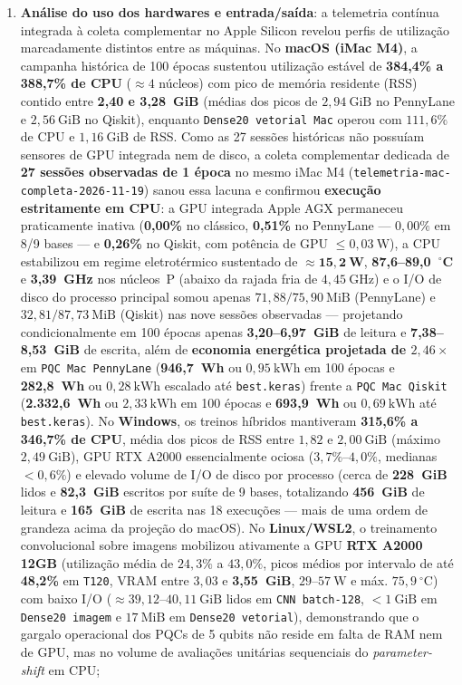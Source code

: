 \documentclass[
    12pt,
    openright,
    oneside,
    a4paper,
    english,
    brazil
]{abntex2}
\begin{document}
\begin{enumerate}
    \item \textbf{Análise do uso dos hardwares e entrada/saída}: a telemetria contínua integrada à coleta complementar no Apple Silicon revelou perfis de utilização marcadamente distintos entre as máquinas. No \textbf{macOS (iMac M4)}, a campanha histórica de 100 épocas sustentou utilização estável de \textbf{384,4\% a 388,7\% de CPU} (\(\approx 4\) núcleos) com pico de memória residente (RSS) contido entre \textbf{2,40 e 3,28~GiB} (médias dos picos de \(2{,}94~\text{GiB}\) no PennyLane e \(2{,}56~\text{GiB}\) no Qiskit), enquanto \texttt{Dense20 vetorial Mac} operou com \(111{,}6\%\) de CPU e \(1{,}16~\text{GiB}\) de RSS. Como as 27 sessões históricas não possuíam sensores de GPU integrada nem de disco, a coleta complementar dedicada de \textbf{27 sessões observadas de 1 época} no mesmo iMac M4 (\texttt{telemetria-mac-\allowbreak completa-2026-11-19}) sanou essa lacuna e confirmou \textbf{execução estritamente em CPU}: a GPU integrada Apple AGX permaneceu praticamente inativa (\textbf{0,00\%} no clássico, \textbf{0,51\%} no PennyLane --- \(0{,}00\%\) em 8/9 bases --- e \textbf{0,26\%} no Qiskit, com potência de GPU \(\le 0{,}03~\text{W}\)), a CPU estabilizou em regime eletrotérmico sustentado de \(\approx \mathbf{15{,}2~\text{W}}\), \textbf{87,6--89,0~\(^\circ\)C} e \textbf{3,39~GHz} nos núcleos~P (abaixo da rajada fria de \(4{,}45~\text{GHz}\)) e o I/O de disco do processo principal somou apenas \(71{,}88/75{,}90~\text{MiB}\) (PennyLane) e \(32{,}81/87{,}73~\text{MiB}\) (Qiskit) nas nove sessões observadas --- projetando condicionalmente em 100 épocas apenas \textbf{3,20--6,97~GiB} de leitura e \textbf{7,38--8,53~GiB} de escrita, além de \textbf{economia energética projetada de \(2{,}46\times\)} em \texttt{PQC Mac PennyLane} (\textbf{946,7~Wh} ou \(0{,}95~\text{kWh}\) em 100 épocas e \textbf{282,8~Wh} ou \(0{,}28~\text{kWh}\) escalado até \texttt{best.keras}) frente a \texttt{PQC Mac Qiskit} (\textbf{2.332,6~Wh} ou \(2{,}33~\text{kWh}\) em 100 épocas e \textbf{693,9~Wh} ou \(0{,}69~\text{kWh}\) até \texttt{best.keras}). No \textbf{Windows}, os treinos híbridos mantiveram \textbf{315,6\% a 346,7\% de CPU}, média dos picos de RSS entre \(1{,}82\) e \(2{,}00~\text{GiB}\) (máximo \(2{,}49~\text{GiB}\)), GPU RTX A2000 essencialmente ociosa (\(3{,}7\%\)--\(4{,}0\%\), medianas \(< 0{,}6\%\)) e elevado volume de I/O de disco por processo (cerca de \textbf{228~GiB} lidos e \textbf{82,3~GiB} escritos por suíte de 9 bases, totalizando \textbf{456~GiB} de leitura e \textbf{165~GiB} de escrita nas 18 execuções --- mais de uma ordem de grandeza acima da projeção do macOS). No \textbf{Linux/WSL2}, o treinamento convolucional sobre imagens mobilizou ativamente a GPU \textbf{RTX A2000 12GB} (utilização média de \(24{,}3\%\) a \(43{,}0\%\), picos médios por intervalo de até \textbf{48,2\%} em \texttt{T120}, VRAM entre \(3{,}03\) e \textbf{3,55~GiB}, \(29\)--\(57~\text{W}\) e máx. \(75{,}9~^\circ\text{C}\)) com baixo I/O (\(\approx 39{,}12\)--\(40{,}11~\text{GiB}\) lidos em \texttt{CNN batch-128}, \(< 1~\text{GiB}\) em \texttt{Dense20 imagem} e \(17~\text{MiB}\) em \texttt{Dense20 vetorial}), demonstrando que o gargalo operacional dos PQCs de 5 qubits não reside em falta de RAM nem de GPU, mas no volume de avaliações unitárias sequenciais do \textit{parameter-shift} em CPU;

\end{enumerate}
\end{document}
